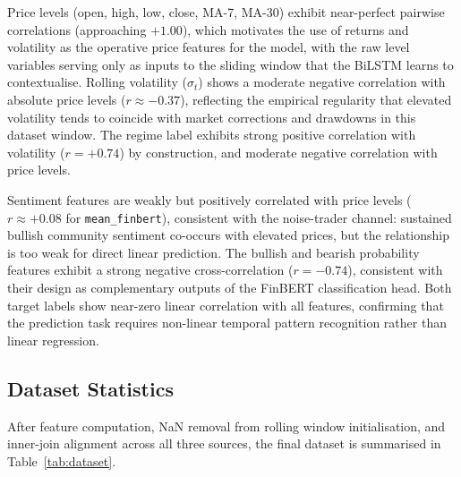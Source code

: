 \documentclass[journal]{IEEEtran}
\newcommand{\bilstm}{BiLSTM}
\begin{document}
Price levels (open, high, low, close, MA-7, MA-30) exhibit near-perfect
pairwise correlations (approaching $+1.00$), which motivates the use of
returns and volatility as the operative price features for the model, with
the raw level variables serving only as inputs to the sliding window that
the \bilstm{} learns to contextualise. Rolling volatility ($\sigma_t$) shows
a moderate negative correlation with absolute price levels ($r \approx -0.37$),
reflecting the empirical regularity that elevated volatility tends to coincide
with market corrections and drawdowns in this dataset window. The regime label
exhibits strong positive correlation with volatility ($r = +0.74$) by
construction, and moderate negative correlation with price levels.

Sentiment features are weakly but positively correlated with price levels
($r \approx +0.08$ for \texttt{mean\_finbert}), consistent with the noise-trader
channel: sustained bullish community sentiment co-occurs with elevated prices,
but the relationship is too weak for direct linear prediction. The bullish
and bearish probability features exhibit a strong negative cross-correlation
($r = -0.74$), consistent with their design as complementary outputs of the
FinBERT classification head. Both target labels show near-zero linear correlation
with all features, confirming that the prediction task requires non-linear
temporal pattern recognition rather than linear regression.

\subsection{Dataset Statistics}
After feature computation, NaN removal from rolling window initialisation, and
inner-join alignment across all three sources, the final dataset is summarised
in Table~\ref{tab:dataset}.
\end{document}
